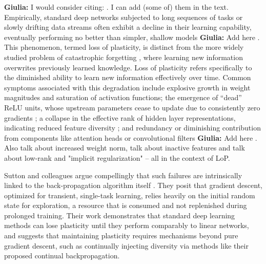 \documentclass{article}
\newcommand{\giulia}[1]{{\color{ForestGreen}\textbf{Giulia:} #1}}
\begin{document}
\giulia{I would consider citing: \citep{berariu2021plasticity,lyle2023understanding,kumar2024regenerative,dohare2023maintaining,sokar2023dormant,chaudhry2018riemannian,ash2020warmstarting,nikishin2022primacy,dohare2021continual}. I can add (some of) them in the text.\newline}
Empirically, standard deep networks subjected to long sequences of tasks or slowly drifting data streams often exhibit a decline in their learning capability, eventually performing no better than simpler, shallow models \cite{dohare2024loss}\giulia{Add here \citep{berariu2021plasticity,dohare2021continual,nikishin2022primacy}}. This phenomenon, termed loss of plasticity, is distinct from the more widely studied problem of catastrophic forgetting \cite{mccloskey1989catastrophic, ratcliff1990connectionist, french1999catastrophic}, where learning new information overwrites previously learned knowledge. Loss of plasticity refers specifically to the diminished ability to learn new information effectively over time. Common symptoms associated with this degradation include explosive growth in weight magnitudes and saturation of activation functions; the emergence of ``dead'' ReLU units, whose upstream parameters cease to update due to consistently zero gradients \cite{nair2010rectified}; a collapse in the effective rank of hidden layer representations, indicating reduced feature diversity \cite{papyan2020prevalence, huh2022lowrank}; and redundancy or diminishing contribution from components like attention heads or convolutional filters \giulia{Add here \citep{lyle2023understanding}. Also \citep{nikishin2022primacy} talk about increased weight norm, \citep{dohare2021continual, lyle2022understanding} talk about inactive features and \citep{kumar2020implicit,gulcehre2022empirical} talk about low-rank and "implicit regularization" -- all in the context of LoP}.


Sutton and colleagues argue compellingly that such failures are intrinsically linked to the back-propagation algorithm itself \cite{dohare2024loss}. They posit that gradient descent, optimized for transient, single-task learning, relies heavily on the initial random state for exploration, a resource that is consumed and not replenished during prolonged training. Their work demonstrates that standard deep learning methods can lose plasticity until they perform comparably to linear networks, and suggests that maintaining plasticity requires mechanisms beyond pure gradient descent, such as continually injecting diversity via methods like their proposed continual backpropagation.
\end{document}
